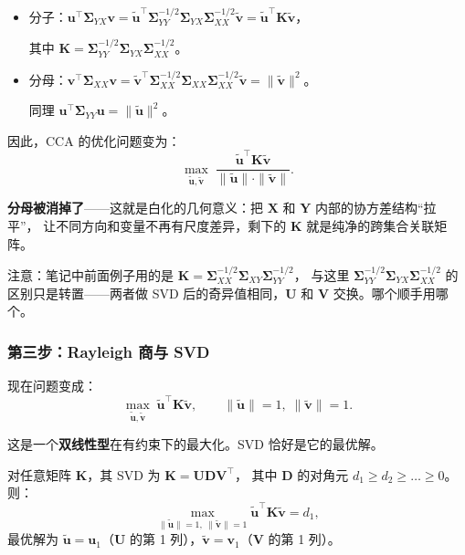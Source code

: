 \begin{itemize}
    \item 分子：$\mathbf{u}^\top \bm{\Sigma}_{YX} \mathbf{v}
    = \tilde{\mathbf{u}}^\top \bm{\Sigma}_{YY}^{-1/2} \bm{\Sigma}_{YX} \bm{\Sigma}_{XX}^{-1/2} \tilde{\mathbf{v}}
    = \tilde{\mathbf{u}}^\top \mathbf{K} \tilde{\mathbf{v}}$，

    其中 $\boxed{\mathbf{K} = \bm{\Sigma}_{YY}^{-1/2} \bm{\Sigma}_{YX} \bm{\Sigma}_{XX}^{-1/2}}$。

    \item 分母：$\mathbf{v}^\top \bm{\Sigma}_{XX} \mathbf{v}
    = \tilde{\mathbf{v}}^\top \bm{\Sigma}_{XX}^{-1/2} \bm{\Sigma}_{XX} \bm{\Sigma}_{XX}^{-1/2} \tilde{\mathbf{v}}
    = \|\tilde{\mathbf{v}}\|^2$。

    同理 $\mathbf{u}^\top \bm{\Sigma}_{YY} \mathbf{u} = \|\tilde{\mathbf{u}}\|^2$。
\end{itemize}

因此，CCA 的优化问题变为：
\[
    \max_{\tilde{\mathbf{u}}, \tilde{\mathbf{v}}} \;
    \frac{\tilde{\mathbf{u}}^\top \mathbf{K} \tilde{\mathbf{v}}}
         {\|\tilde{\mathbf{u}}\| \cdot \|\tilde{\mathbf{v}}\|}.
\]

\textbf{分母被消掉了}——这就是白化的几何意义：把 $\mathbf{X}$ 和 $\mathbf{Y}$ 内部的协方差结构``拉平''，
让不同方向和变量不再有尺度差异，剩下的 $\mathbf{K}$ 就是纯净的跨集合关联矩阵。

注意：笔记中前面例子用的是 $\mathbf{K} = \bm{\Sigma}_{XX}^{-1/2} \bm{\Sigma}_{XY} \bm{\Sigma}_{YY}^{-1/2}$，
与这里 $\bm{\Sigma}_{YY}^{-1/2} \bm{\Sigma}_{YX} \bm{\Sigma}_{XX}^{-1/2}$ 的区别只是转置——两者做 SVD 后的奇异值相同，$\mathbf{U}$ 和 $\mathbf{V}$ 交换。哪个顺手用哪个。

\subsubsection{第三步：Rayleigh 商与 SVD}

现在问题变成：
\[
    \max_{\tilde{\mathbf{u}}, \tilde{\mathbf{v}}} \;
    \tilde{\mathbf{u}}^\top \mathbf{K} \tilde{\mathbf{v}},\qquad
    \|\tilde{\mathbf{u}}\| = 1,\; \|\tilde{\mathbf{v}}\| = 1.
\]

这是一个\textbf{双线性型}在有约束下的最大化。SVD 恰好是它的最优解。

\begin{theorem}
对任意矩阵 $\mathbf{K}$，其 SVD 为 $\mathbf{K} = \mathbf{U} \mathbf{D} \mathbf{V}^\top$，
其中 $\mathbf{D}$ 的对角元 $d_1 \ge d_2 \ge \dots \ge 0$。则：
\[
    \max_{\|\tilde{\mathbf{u}}\|=1,\; \|\tilde{\mathbf{v}}\|=1} \tilde{\mathbf{u}}^\top \mathbf{K} \tilde{\mathbf{v}}
    = d_1,
\]
最优解为 $\tilde{\mathbf{u}} = \mathbf{u}_1$（$\mathbf{U}$ 的第 1 列），$\tilde{\mathbf{v}} = \mathbf{v}_1$（$\mathbf{V}$ 的第 1 列）。
\end{theorem}

